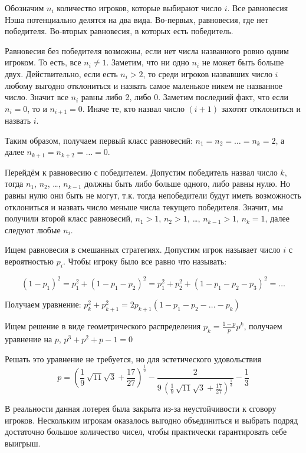 \begin{solution}
Обозначим $n_i$ количество игроков, которые выбирают число $i$. Все равновесия Нэша потенциально делятся на два вида. Во-первых, равновесия, где нет победителя. Во-вторых равновесия, в которых есть победитель.

Равновесия без победителя возможны, если нет числа названного ровно одним игроком. То есть, все $n_i\neq 1$. Заметим, что ни одно $n_i$ не может быть больше двух.  Действительно, если есть $n_i>2$, то среди игроков назвавших число $i$ любому выгодно отклониться и назвать самое маленькое никем не названное число. Значит все $n_i$ равны либо 2, либо 0. Заметим последний факт, что если $n_i=0$, то и $n_{i+1}=0$. Иначе те, кто назвал число $(i+1)$ захотят отклониться и назвать $i$. 

Таким образом, получаем первый класс равновесий: $n_1=n_2=\ldots=n_{k}=2$, а далее $n_{k+1}=n_{k+2}=\ldots=0$. 

Перейдём к равновесию с победителем.  Допустим победитель назвал число $k$, тогда $n_1$, $n_2$, \ldots, $n_{k-1}$ должны быть либо больше одного, либо равны нулю. Но равны нулю они быть не могут, т.к. тогда непобедители будут иметь возможность отклониться и назвать число меньше числа текущего победителя. Значит, мы получили второй класс равновесий, $n_1>1$, $n_2>1$, \ldots, $n_{k-1}>1$, $n_k=1$, далее следуют любые $n_i$.

Ищем равновесия в смешанных стратегиях. Допустим игрок называет число $i$  с вероятностью $p_i$. Чтобы игроку было все равно что называть:


\[
(1-p_1)^2 = p_1^2+(1-p_1-p_2)^2 = p_1^2+p_2^2+(1-p_1-p_2-p_3)^2 =\ldots
\]

Получаем уравнение:
$p_{k}^{2}+p_{k+1}^{2}=2p_{k+1}(1-p_{1}-p_{2}-\ldots -p_{k})$

Ищем решение в виде геометрического распределения $p_{k}=\frac{1-p}{p}p^{k}$, получаем уравнение на $p$, 
$p^{3}+p^{2}+p-1=0$ 

Решать это уравнение не требуется, но для эстетического удовольствия
\[
p = {\left(\frac{1}{9} \, \sqrt{11} \sqrt{3} + \frac{17}{27}\right)}^{\frac{1}{3}} - \frac{2}{9 \, {\left(\frac{1}{9} \, \sqrt{11} \sqrt{3} + \frac{17}{27}\right)}^{\frac{1}{3}}} - \frac{1}{3}
\]

В реальности данная лотерея была закрыта из-за неустойчивости к сговору игроков. Нескольким игрокам оказалось выгодно объединиться и выбрать подряд достаточно большое количество чисел, чтобы практически гарантировать себе выигрыш.
\end{solution}


